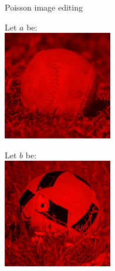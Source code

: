 \documentclass[UKenglish,aspectratio=169]{beamer}
\begin{document}
\begin{frame}{Poisson image editing}
\pause
\begin{minipage}{.12\linewidth}
Let $a$ be:\\
    \includegraphics[width=\linewidth]{../manuscript/img/pie-baseball-red.png}
\end{minipage}
\pause
\quad
\begin{minipage}{.12\linewidth}
Let $b$ be:\\
    \includegraphics[width=\linewidth]{../manuscript/img/pie-football-red.png}

\end{minipage}
\end{frame}
\end{document}
